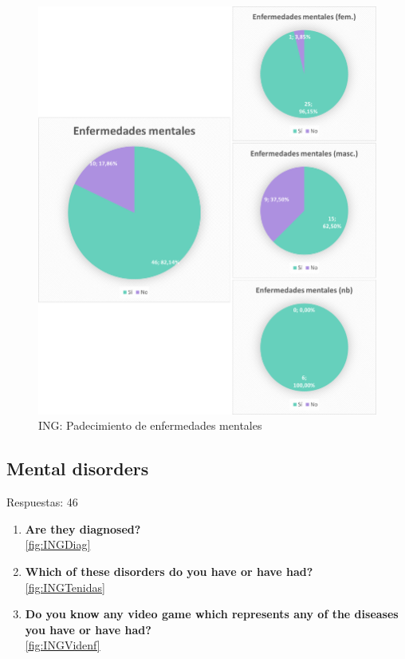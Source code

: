 \documentclass[12pt, a4paper,twoside,titlepage]{book}
\begin{document}
\begin{figure}
    \centering
    \includegraphics[width=1\linewidth]{ANEXO ING/19AnexINGEnf}
    \caption{ING: Padecimiento de enfermedades mentales}
    \label{fig:INGEnfer}
\end{figure}


\subsection{Mental disorders}
Respuestas: 46
\begin{enumerate}[label=\textbf{\arabic*}.]
     \item \textbf{Are they diagnosed?}\\
     \ref{fig:INGDiag}
     \item \textbf{Which of these disorders do you have or have had? }\\
     \ref{fig:INGTenidas}
     \item \textbf{Do you know any video game which represents any of the diseases you have or have had?}\\
     \ref{fig:INGVidenf}
\end{enumerate}
\end{document}
